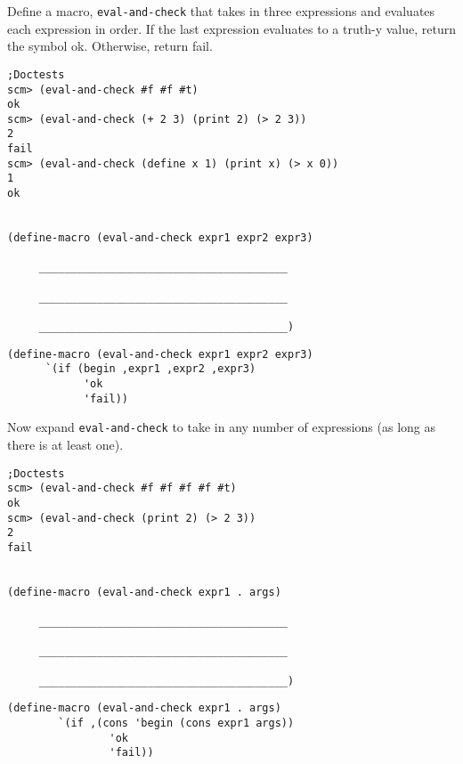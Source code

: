\begin{blocksection}

\question Define a macro, \texttt{eval-and-check} that takes in three expressions and evaluates each expression in order. 
If the last expression evaluates to a truth-y value, return the symbol ok. Otherwise, return fail.

\begin{lstlisting}
;Doctests
scm> (eval-and-check #f #f #t)
ok
scm> (eval-and-check (+ 2 3) (print 2) (> 2 3))
2
fail
scm> (eval-and-check (define x 1) (print x) (> x 0))
1
ok


(define-macro (eval-and-check expr1 expr2 expr3)
     
     _______________________________________

     _______________________________________

     _______________________________________)
\end{lstlisting}
\end{blocksection}
\begin{blocksection}
\begin{solution}[.25in]
\begin{lstlisting}
(define-macro (eval-and-check expr1 expr2 expr3)
      `(if (begin ,expr1 ,expr2 ,expr3)
            'ok
            'fail))
\end{lstlisting}
\end{solution}

\end{blocksection}

\begin{blocksection}
\question Now expand \texttt{eval-and-check} to take in any number of expressions (as long as there is at least one).

\begin{lstlisting}
;Doctests
scm> (eval-and-check #f #f #f #f #t)
ok
scm> (eval-and-check (print 2) (> 2 3))
2
fail


(define-macro (eval-and-check expr1 . args)
     
     _______________________________________

     _______________________________________

     _______________________________________)
\end{lstlisting}
\begin{solution}[.25in]
\begin{lstlisting}
(define-macro (eval-and-check expr1 . args)
        `(if ,(cons 'begin (cons expr1 args))
                'ok
                'fail))
\end{lstlisting}
\end{solution}
\end{blocksection}